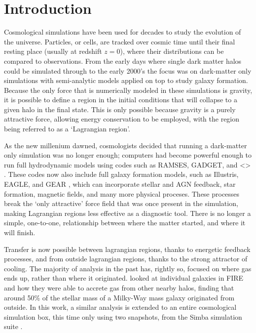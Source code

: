 \section{Introduction}

Cosmological simulations have been used for decades to study the evolution of
the universe. Particles, or cells, are tracked over cosmic time until their
final resting place (usually at redshift $z=0$), where their distributions can
be compared to observations. From the early days where single dark matter halos
could be simulated through to the early 2000's the focus was on dark-matter
only simulations with semi-analytic models applied on top to study galaxy
formation. Because the only force that is numerically modeled in these
simulations is gravity, it is possible to define a region in the initial
conditions that will collapse to a given halo in the final state. This is only
possible because gravity is a purely attractive force, allowing energy
conservation to be employed, with the region being referred to as a `Lagrangian
region'.

As the new millenium dawned, cosmologists decided that running a dark-matter
only simulation was no longer enough; computers had become powerful enough to
run full hydrodynamic models using codes such as RAMSES, GADGET, and <>
\citep{}. These codes now also include full galaxy formation models, such as
Illustris, EAGLE, and GEAR \citep{}, which can incorporate stellar and AGN
feedback, star formation, magnetic fields, and many more physical proceses.
These processes break the `only attractive' force field that was once present
in the simulation, making Lagrangian regions less effective as a diagnostic
tool. There is no longer a simple, one-to-one, relationship between where
the matter started, and where it will finish.

Transfer is now possible between lagrangian regions, thanks to energetic 
feedback processes, and from outside lagrangian regions, thanks to the
strong attractor of cooling. The majority of analysis in the past has,
rightly so, focused on where gas ends up, rather than where it originated.
\citet{anglesalcazar2017} looked at individual galaxies in FIRE \citep{fire}
and how they were able to accrete gas from other nearby halos, finding that
around 50\% of the stellar mass of a Milky-Way mass galaxy originated from
outside. In this work, a similar analysis is extended to an entire
cosmological simulation box, this time only using two snapshots, from
the Simba simulation suite \citep{dave2018}.
